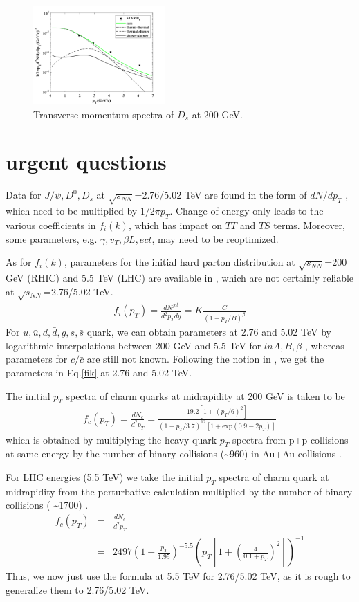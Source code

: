 \documentclass[twocolumn,aps,superscriptaddress,nofootinbib,floatfix]{revtex4}
\def\eq{{\,=\,}}
\def\bq{\begin{eqnarray}}
\def\eq{\end{eqnarray}}
\begin{document}
	\begin{figure}[pht]
	\includegraphics[width=0.45\textwidth]{Ds_200GeV.png}
	\centering
	\caption{Transverse momentum spectra of $D_s$ at 200 GeV.}
	\label{fig3}
	\end{figure}
	
	
\section{urgent questions}
	Data for $J/\psi, D^0, D_s$ at $\sqrt{s_{NN}}$=2.76/5.02 TeV are found in the form of $dN/dp_T$ \cite{jpsi_276, jpsi_502, D0_276,D0_502,Ds_276,Ds_502}, which need to be multiplied by $1/2\pi p_T$. Change of energy only leads to the various coefficients in $f_i(k)$, which has impact on $TT$ and $TS$ terms. Moreover, some parameters, e.g. $\gamma, v_T, \beta L, ect$, may need to be reoptimized.
	
	As for $f_i(k)$, parameters for the initial hard parton distribution at $\sqrt{s_{NN}}$=200 GeV (RHIC) and 5.5 TeV (LHC) are available in \cite{fik14, fik15}, which are not certainly reliable at $\sqrt{s_{NN}}$=2.76/5.02 TeV.
	\bq
		f_i(p_T)=\frac{dN^{jet}}{d^2p_T dy}=K\frac{C}{(1+p_T/B)^\beta}\label{fik}
	\eq
	 For $u, \bar u, d, \bar d, g, s, \bar s$ quark, we can obtain parameters at 2.76 and 5.02 TeV  by logarithmic interpolations between 200 GeV and 5.5 TeV for $lnA, B, \beta$ \cite{Zhu_2020}, whereas parameters for $c/\bar c$ are still not known. Following the notion in \cite{Zhu_2020}, we get the parameters in Eq.\ref{fik} at 2.76 and 5.02 TeV.
	
	The initial $p_T$ spectra of charm quarks at midrapidity at 200 GeV is taken to be
	\bq
		f_c(p_T)=\frac{dN_c}{d^2 p_T}=
		\frac{19.2\left[1+(p_T/6)^2\right]}{(1+p_T/3.7)^{12}\left[1+\text{exp}(0.9-2p_T)\right] }
	\eq
	which is obtained by multiplying the heavy quark $p_T$ spectra from p+p collisions at same energy by the number of binary collisions (\textasciitilde 960) in Au+Au collisions \cite{fik15}.
	
	For LHC energies (5.5 TeV) we take the initial $p_T$ spectra of charm quark at midrapidity from the perturbative calculation multiplied by the number of binary collisions ( \textasciitilde 1700) \cite{Liu:2008bw}.
	\begin{eqnarray}
	f_c(p_T)&=&\frac{dN_c}{d^2 p_T}\nonumber\\ 
	&=&2497(1+\frac{p_T}{1.95})^{-5.5}
	\left(p_T\left[1+\left(\frac{4}{0.1+p_T }\right)^2\right] \right)^{-1}	
	\end{eqnarray}
	Thus, we now just use the formula at 5.5 TeV for 2.76/5.02 TeV, as it is rough to generalize them to 2.76/5.02 TeV. 
	
\end{document}
